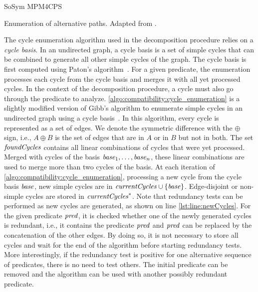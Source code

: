 \begin{copiedFrom}{SoSym MPM4CPS}
\begin{algorithm}
    
    \caption[Enumeration of alternative paths]{Enumeration of alternative paths. Adapted from .}
    \label{algo:compatibility:cycle_enumeration}
\end{algorithm}

The cycle enumeration algorithm used in the decomposition procedure relies on a \textit{cycle basis}. In an undirected graph, a cycle basis is a set of simple cycles that can be combined to generate all other simple cycles of the graph. The cycle basis is first computed using Paton's algorithm~\cite{paton1969algorithm}. For a given predicate, the enumeration processes each cycle from the cycle basis and merges it with all yet processed cycles. In the context of the decomposition procedure, a cycle must also go through the predicate to analyze. \autoref{algo:compatibility:cycle_enumeration} is a slightly modified version of Gibb's algorithm to enumerate simple cycles in an undirected graph using a cycle basis~\cite{gibbs1969cycle}. In this algorithm, every cycle is represented as a set of edges. We denote the symmetric difference with the $\oplus$ sign, i.e., $A \oplus B$ is the set of edges that are in $A$ or in $B$ but not in both. The set $\mathit{foundCycles}$ contains all linear combinations of cycles that were yet processed. Merged with cycles of the basis $\mathit{base}_1, \dots, \mathit{base}_n$, these linear combinations are used to merge more than two cycles of the basis. At each iteration of \autoref{algo:compatibility:cycle_enumeration}, processing a new cycle from the cycle basis $\mathit{base}$, new simple cycles are in $\mathit{currentCycles} \cup \{\mathit{base}\}$. Edge-disjoint or non-simple cycles are stored in $\mathit{currentCycles}^*$. Note that redundancy tests can be performed as new cycles are generated, as shown on line \ref{lst:line:newCycles}. For the given predicate $\mathit{pred}$, it is checked whether one of the newly generated cycles is redundant, i.e., it contains the predicate $\mathit{pred}$ and $\mathit{pred}$ can be replaced by the concatenation of the other edges. By doing so, it is not necessary to store all cycles and wait for the end of the algorithm before starting redundancy tests. More interestingly, if the redundancy test is positive for one alternative sequence of predicates, there is no need to test others. The initial predicate can be removed and the algorithm can be used with another possibly redundant predicate.
  

\end{copiedFrom}
